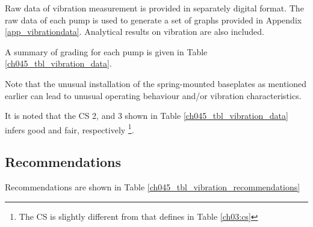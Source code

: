 Raw data of vibration measurement is provided in separately digital format. The raw data of each pump is used to generate a set of graphs provided in Appendix \ref{app_vibrationdata}. Analytical results on vibration are also included.

A summary of grading for each pump is given in Table \ref{ch045_tbl_vibration_data}.



Note that the unusual installation of the spring-mounted baseplates as mentioned earlier can lead to unusual operating behaviour and/or vibration characteristics. 

It is noted that the CS 2, and 3 shown in Table \ref{ch045_tbl_vibration_data} infers good and fair, respectively \footnote{The CS is slightly different from that defines in Table \ref{ch03:cs}}. 

%

\subsection{Recommendations}


Recommendations are shown in Table \ref{ch045_tbl_vibration_recommendations}

